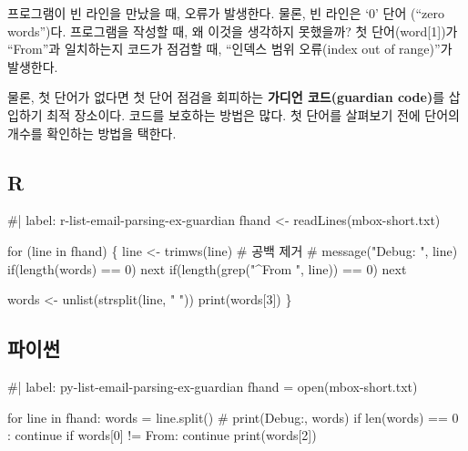 \documentclass[
  letterpaper,
]{book}
\newenvironment{Shaded}{\begin{snugshade}}{\end{snugshade}}
\newcommand{\NormalTok}[1]{\textcolor[rgb]{0.00,0.23,0.31}{#1}}
\begin{document}
프로그램이 빈 라인을 만났을 때, 오류가 발생한다. 물론, 빈 라인은 `0'
단어 (``zero words'')다. 프로그램을 작성할 때, 왜 이것을 생각하지
못했을까? 첫 단어(word{[}1{]})가 ``From''과 일치하는지 코드가 점검할 때,
``인덱스 범위 오류(index out of range)''가 발생한다.

물론, 첫 단어가 없다면 첫 단어 점검을 회피하는 \textbf{가디언
코드(guardian code)}를 삽입하기 최적 장소이다. 코드를 보호하는 방법은
많다. 첫 단어를 살펴보기 전에 단어의 개수를 확인하는 방법을 택한다.

\subsection{R}

\begin{Shaded}
\begin{Highlighting}[]
\NormalTok{\#| label: r{-}list{-}email{-}parsing{-}ex{-}guardian}
\NormalTok{fhand \textless{}{-} readLines(\textquotesingle{}mbox{-}short.txt\textquotesingle{})}

\NormalTok{for (line in fhand) \{}
\NormalTok{    line \textless{}{-} trimws(line)  \# 공백 제거}
\NormalTok{    \# message("Debug: ", line)}
\NormalTok{    if(length(words) == 0) next}
\NormalTok{    if(length(grep("\^{}From ", line)) == 0) next}
    
\NormalTok{    words \textless{}{-} unlist(strsplit(line, " "))}
\NormalTok{    print(words[3])}
\NormalTok{\}}
\end{Highlighting}
\end{Shaded}

\subsection{파이썬}

\begin{Shaded}
\begin{Highlighting}[]
\NormalTok{\#| label: py{-}list{-}email{-}parsing{-}ex{-}guardian}
\NormalTok{fhand = open(\textquotesingle{}mbox{-}short.txt\textquotesingle{})}

\NormalTok{for line in fhand:}
\NormalTok{    words = line.split()}
\NormalTok{    \# print(\textquotesingle{}Debug:\textquotesingle{}, words)}
\NormalTok{    if len(words) == 0 : continue}
\NormalTok{    if words[0] != \textquotesingle{}From\textquotesingle{}:}
\NormalTok{        continue}
\NormalTok{    print(words[2])}
\end{Highlighting}
\end{Shaded}
\end{document}
